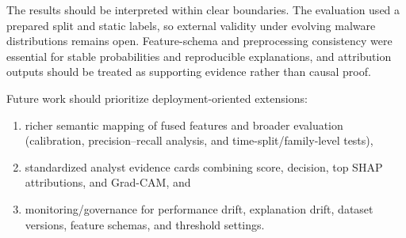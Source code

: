 \documentclass[conference]{IEEEtran}
\begin{document}
The results should be interpreted within clear boundaries.
The evaluation used a prepared split and static labels, so external validity under evolving malware distributions remains open.
Feature-schema and preprocessing consistency were essential for stable probabilities and reproducible explanations, and attribution outputs should be treated as supporting evidence rather than causal proof.

Future work should prioritize deployment-oriented extensions: 
 \begin{enumerate}
  \item[(i)]
  richer semantic mapping of fused features and broader evaluation (calibration, precision--recall analysis, and time-split/family-level tests), 
  \item[(ii)]
  standardized analyst evidence cards combining score, decision, top SHAP attributions, and Grad-CAM, and
  \item[(iii)]
   monitoring/governance for performance drift, explanation drift, dataset versions, feature schemas, and threshold settings.
\end{enumerate}






\end{document}

